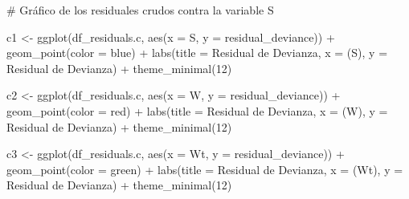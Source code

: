 \documentclass[
  letterpaper,
  DIV=11,
  numbers=noendperiod]{scrartcl}
\newenvironment{Shaded}{\begin{snugshade}}{\end{snugshade}}
\newcommand{\AttributeTok}[1]{\textcolor[rgb]{0.40,0.45,0.13}{#1}}
\newcommand{\CommentTok}[1]{\textcolor[rgb]{0.37,0.37,0.37}{#1}}
\newcommand{\DecValTok}[1]{\textcolor[rgb]{0.68,0.00,0.00}{#1}}
\newcommand{\FunctionTok}[1]{\textcolor[rgb]{0.28,0.35,0.67}{#1}}
\newcommand{\NormalTok}[1]{\textcolor[rgb]{0.00,0.23,0.31}{#1}}
\newcommand{\OtherTok}[1]{\textcolor[rgb]{0.00,0.23,0.31}{#1}}
\newcommand{\SpecialCharTok}[1]{\textcolor[rgb]{0.37,0.37,0.37}{#1}}
\newcommand{\StringTok}[1]{\textcolor[rgb]{0.13,0.47,0.30}{#1}}
\begin{document}
\begin{Shaded}
\begin{Highlighting}[]
\CommentTok{\# Gráfico de los residuales crudos contra la variable S}

\NormalTok{c1 }\OtherTok{\textless{}{-}} \FunctionTok{ggplot}\NormalTok{(df\_residuals.c, }\FunctionTok{aes}\NormalTok{(}\AttributeTok{x =}\NormalTok{ S, }\AttributeTok{y =}\NormalTok{ residual\_deviance)) }\SpecialCharTok{+}
    \FunctionTok{geom\_point}\NormalTok{(}\AttributeTok{color =} \StringTok{\textquotesingle{}blue\textquotesingle{}}\NormalTok{) }\SpecialCharTok{+}
    \FunctionTok{labs}\NormalTok{(}\AttributeTok{title =} \StringTok{\textquotesingle{}Residual de Devianza\textquotesingle{}}\NormalTok{, }\AttributeTok{x =} \StringTok{\textquotesingle{}(S)\textquotesingle{}}\NormalTok{, }\AttributeTok{y =} \StringTok{\textquotesingle{}Residual de Devianza\textquotesingle{}}\NormalTok{) }\SpecialCharTok{+}
    \FunctionTok{theme\_minimal}\NormalTok{(}\DecValTok{12}\NormalTok{)}

\NormalTok{c2 }\OtherTok{\textless{}{-}} \FunctionTok{ggplot}\NormalTok{(df\_residuals.c, }\FunctionTok{aes}\NormalTok{(}\AttributeTok{x =}\NormalTok{ W, }\AttributeTok{y =}\NormalTok{ residual\_deviance)) }\SpecialCharTok{+}
    \FunctionTok{geom\_point}\NormalTok{(}\AttributeTok{color =} \StringTok{\textquotesingle{}red\textquotesingle{}}\NormalTok{) }\SpecialCharTok{+}
    \FunctionTok{labs}\NormalTok{(}\AttributeTok{title =} \StringTok{\textquotesingle{}Residual de Devianza\textquotesingle{}}\NormalTok{, }\AttributeTok{x =} \StringTok{\textquotesingle{}(W)\textquotesingle{}}\NormalTok{, }\AttributeTok{y =} \StringTok{\textquotesingle{}Residual de Devianza\textquotesingle{}}\NormalTok{) }\SpecialCharTok{+}
    \FunctionTok{theme\_minimal}\NormalTok{(}\DecValTok{12}\NormalTok{)}

\NormalTok{c3 }\OtherTok{\textless{}{-}} \FunctionTok{ggplot}\NormalTok{(df\_residuals.c, }\FunctionTok{aes}\NormalTok{(}\AttributeTok{x =}\NormalTok{ Wt, }\AttributeTok{y =}\NormalTok{ residual\_deviance)) }\SpecialCharTok{+}
    \FunctionTok{geom\_point}\NormalTok{(}\AttributeTok{color =} \StringTok{\textquotesingle{}green\textquotesingle{}}\NormalTok{) }\SpecialCharTok{+}
    \FunctionTok{labs}\NormalTok{(}\AttributeTok{title =} \StringTok{\textquotesingle{}Residual de Devianza\textquotesingle{}}\NormalTok{, }\AttributeTok{x =} \StringTok{\textquotesingle{}(Wt)\textquotesingle{}}\NormalTok{, }\AttributeTok{y =} \StringTok{\textquotesingle{}Residual de Devianza\textquotesingle{}}\NormalTok{) }\SpecialCharTok{+}
    \FunctionTok{theme\_minimal}\NormalTok{(}\DecValTok{12}\NormalTok{)}


\end{Highlighting}
\end{Shaded}
\end{document}
